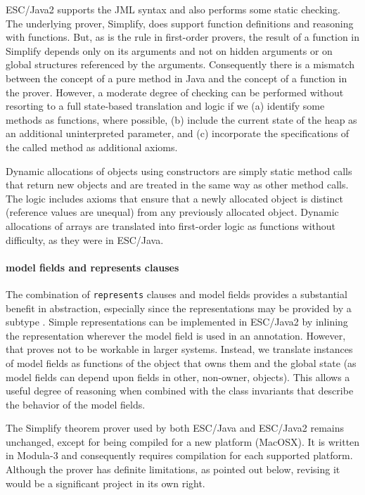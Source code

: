 \documentclass{llncs}
\begin{document}
ESC/Java2 supports the JML syntax and also performs some static
checking.  The underlying prover, Simplify, does support function
definitions and reasoning with functions.  But, as is the rule in
first-order provers, the result of a function in Simplify depends only on its
arguments and not on hidden arguments or on global structures
referenced by the arguments.  Consequently there is a mismatch between
the concept of a pure method in Java and the concept of a function in
the prover.  However, a moderate degree of checking can be performed
without resorting to a full state-based translation and logic if we
(a) identify some methods as functions, where possible, (b) include
the current state of the heap as an additional uninterpreted
parameter, and (c) incorporate the specifications of the called method
as additional axioms.

Dynamic allocations of objects using constructors are simply static
method calls that return new objects and are treated 
in the same way as other method calls.  The logic 
includes axioms that ensure that a newly allocated object is distinct (reference values
are unequal) from any previously allocated object.  Dynamic allocations of
arrays are translated into first-order logic as functions without
difficulty, as they were in ESC/Java.

\paragraph*{model fields and represents clauses}
The combination of \texttt{represents} clauses and model fields
provides a substantial benefit in abstraction, especially since the
representations may be provided by a subtype \cite{Cheon-etal03}.
Simple representations can be implemented in ESC/Java2 by inlining the
representation wherever the model field is used in an annotation.
However, that proves not to be workable in larger systems.  Instead,
we translate instances of model fields as functions of the object that
owns them and the global state (as model fields can depend upon fields
in other, non-owner, objects).  This allows a useful degree of
reasoning when combined with the class invariants that describe the
behavior of the model fields.

The Simplify theorem prover used by both ESC/Java and ESC/Java2 remains unchanged,
except for being compiled for a new platform (MacOSX).  It is written in Modula-3
and consequently requires compilation for each supported platform.  Although the prover
has definite limitations, as pointed out below, revising it would be a significant project in
its own right.
\end{document}
